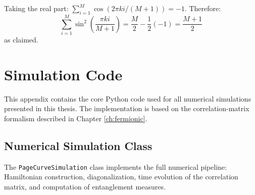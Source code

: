 \documentclass[12pt,oneside,openright]{report}
\theoremstyle{definition}
\theoremstyle{plain}
\theoremstyle{remark}
\begin{document}
Taking the real part: $\sum_{i=1}^M \cos(2\pi k i/(M+1)) = -1$. Therefore:
\begin{equation}
\sum_{i=1}^M \sin^2\left(\frac{\pi k i}{M+1}\right) = \frac{M}{2} - \frac{1}{2}(-1) = \frac{M+1}{2}
\end{equation}
as claimed.


\chapter{Simulation Code}
\label{app:code}

This appendix contains the core Python code used for all numerical simulations presented in this thesis. The implementation is based on the correlation-matrix formalism described in Chapter \ref{ch:fermionic}.

\section{Numerical Simulation Class}
\label{app:code:simulation}

The \texttt{PageCurveSimulation} class implements the full numerical pipeline: Hamiltonian construction, diagonalization, time evolution of the correlation matrix, and computation of entanglement measures.
\end{document}
